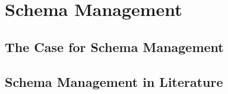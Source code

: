 
\section{Schema Management}\label{sec:schema-management}

\subsection{The Case for Schema Management}

\subsection{Schema Management in Literature}
